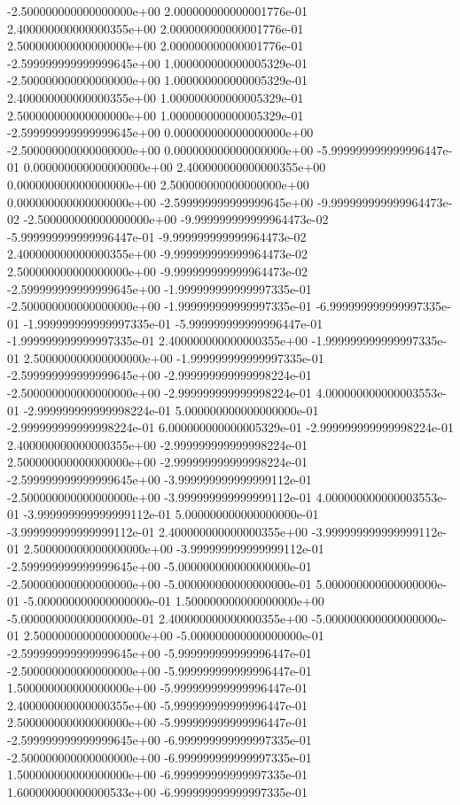 -2.500000000000000000e+00 2.000000000000001776e-01
2.400000000000000355e+00 2.000000000000001776e-01
2.500000000000000000e+00 2.000000000000001776e-01
-2.599999999999999645e+00 1.000000000000005329e-01
-2.500000000000000000e+00 1.000000000000005329e-01
2.400000000000000355e+00 1.000000000000005329e-01
2.500000000000000000e+00 1.000000000000005329e-01
-2.599999999999999645e+00 0.000000000000000000e+00
-2.500000000000000000e+00 0.000000000000000000e+00
-5.999999999999996447e-01 0.000000000000000000e+00
2.400000000000000355e+00 0.000000000000000000e+00
2.500000000000000000e+00 0.000000000000000000e+00
-2.599999999999999645e+00 -9.999999999999964473e-02
-2.500000000000000000e+00 -9.999999999999964473e-02
-5.999999999999996447e-01 -9.999999999999964473e-02
2.400000000000000355e+00 -9.999999999999964473e-02
2.500000000000000000e+00 -9.999999999999964473e-02
-2.599999999999999645e+00 -1.999999999999997335e-01
-2.500000000000000000e+00 -1.999999999999997335e-01
-6.999999999999997335e-01 -1.999999999999997335e-01
-5.999999999999996447e-01 -1.999999999999997335e-01
2.400000000000000355e+00 -1.999999999999997335e-01
2.500000000000000000e+00 -1.999999999999997335e-01
-2.599999999999999645e+00 -2.999999999999998224e-01
-2.500000000000000000e+00 -2.999999999999998224e-01
4.000000000000003553e-01 -2.999999999999998224e-01
5.000000000000000000e-01 -2.999999999999998224e-01
6.000000000000005329e-01 -2.999999999999998224e-01
2.400000000000000355e+00 -2.999999999999998224e-01
2.500000000000000000e+00 -2.999999999999998224e-01
-2.599999999999999645e+00 -3.999999999999999112e-01
-2.500000000000000000e+00 -3.999999999999999112e-01
4.000000000000003553e-01 -3.999999999999999112e-01
5.000000000000000000e-01 -3.999999999999999112e-01
2.400000000000000355e+00 -3.999999999999999112e-01
2.500000000000000000e+00 -3.999999999999999112e-01
-2.599999999999999645e+00 -5.000000000000000000e-01
-2.500000000000000000e+00 -5.000000000000000000e-01
5.000000000000000000e-01 -5.000000000000000000e-01
1.500000000000000000e+00 -5.000000000000000000e-01
2.400000000000000355e+00 -5.000000000000000000e-01
2.500000000000000000e+00 -5.000000000000000000e-01
-2.599999999999999645e+00 -5.999999999999996447e-01
-2.500000000000000000e+00 -5.999999999999996447e-01
1.500000000000000000e+00 -5.999999999999996447e-01
2.400000000000000355e+00 -5.999999999999996447e-01
2.500000000000000000e+00 -5.999999999999996447e-01
-2.599999999999999645e+00 -6.999999999999997335e-01
-2.500000000000000000e+00 -6.999999999999997335e-01
1.500000000000000000e+00 -6.999999999999997335e-01
1.600000000000000533e+00 -6.999999999999997335e-01
